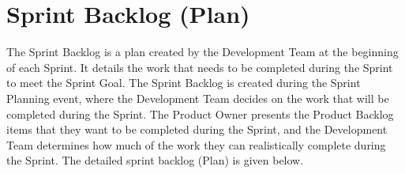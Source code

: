 \documentclass[12pt]{report}
\begin{document}
\section{Sprint Backlog (Plan)}
The Sprint Backlog is a plan created by the Development Team at the beginning of each Sprint. It details the work that needs to be completed during the Sprint to meet the Sprint Goal. The Sprint Backlog is created during the Sprint Planning event, where the Development Team decides on the work that will be completed during the Sprint. The Product Owner presents the Product Backlog items that they want to be completed during the Sprint, and the Development Team determines how much of the work they can realistically complete during the Sprint. The detailed sprint backlog (Plan) is given below.
\begin{table}[htbp]
\LARGE
{}
\end{table}
\end{document}
